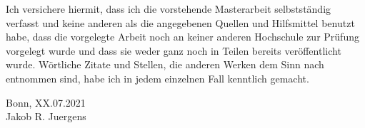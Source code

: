 \documentclass[12pt, a4paper]{article}
\theoremstyle{MAstyle} \newtheorem{assumption}{Assumption}[section]
\theoremstyle{MAstyle} \newtheorem{definition}{Definition}[section]
\theoremstyle{MAstyle} \newtheorem{theorem}{Theorem}[section]
\begin{document}
		\vspace{3cm}
		
		Ich versichere hiermit, dass ich die vorstehende Masterarbeit
		selbstständig verfasst und keine anderen als die angegebenen Quellen
		und Hilfsmittel benutzt habe, dass die vorgelegte Arbeit noch an keiner
		anderen Hochschule zur Prüfung vorgelegt wurde und dass sie weder
		ganz noch in Teilen bereits veröffentlicht wurde. Wörtliche Zitate und
		Stellen, die anderen Werken dem Sinn nach entnommen sind, habe ich
		in jedem einzelnen Fall kenntlich gemacht.
		
		\vspace{2cm}
		Bonn, XX.07.2021 \hrulefill \\
		\hspace*{0mm}Jakob R. Juergens
		
		\vspace{\fill}
\end{document}
